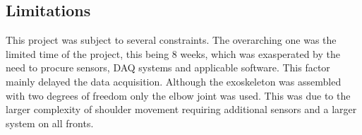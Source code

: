 \subsection{Limitations}
This project was subject to several constraints. The overarching one was the limited time of the project, this being 8 weeks,
which was exasperated by the need to procure sensors, DAQ systems and applicable software. This factor mainly delayed
the data acquisition. Although the exoskeleton was assembled with two degrees of freedom only the elbow joint was used.
This was due to the larger complexity of shoulder movement requiring additional sensors and a larger system on all
fronts.
